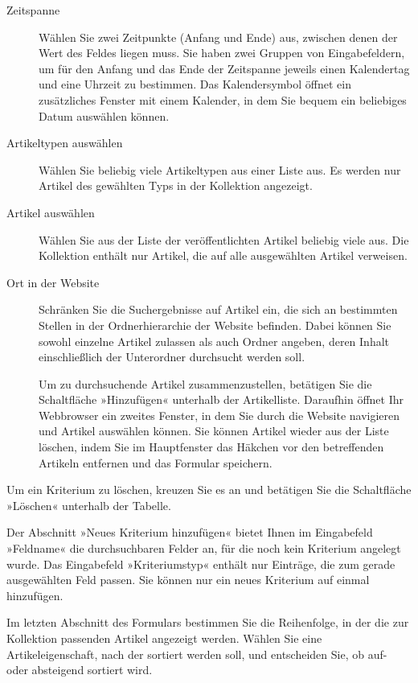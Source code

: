 \documentclass[a4paper,12pt,ngerman]{manual}
\begin{document}
\begin{description}
\item[Zeitspanne] \leavevmode
Wählen Sie zwei Zeitpunkte (Anfang und Ende) aus, zwischen
denen der Wert des Feldes liegen muss. Sie haben zwei Gruppen von
Eingabefeldern, um für den Anfang und das Ende der Zeitspanne jeweils einen
Kalendertag und eine Uhrzeit zu bestimmen. Das Kalendersymbol öffnet ein
zusätzliches Fenster mit einem Kalender, in dem Sie bequem ein beliebiges
Datum auswählen können.

\item[Artikeltypen auswählen] \leavevmode
Wählen Sie beliebig viele Artikeltypen aus einer
Liste aus. Es werden nur Artikel des gewählten Typs in der Kollektion
angezeigt.

\item[Artikel auswählen] \leavevmode
Wählen Sie aus der Liste der veröffentlichten Artikel
beliebig viele aus.  Die Kollektion enthält nur
Artikel, die auf alle ausgewählten Artikel verweisen.

\item[Ort in der Website] \leavevmode
Schränken Sie die Suchergebnisse auf Artikel ein,
die sich an bestimmten Stellen in der Ordnerhierarchie der Website befinden.
Dabei können Sie sowohl einzelne Artikel zulassen als auch Ordner angeben,
deren Inhalt einschließlich der Unterordner durchsucht werden soll.

Um zu durchsuchende Artikel zusammenzustellen, betätigen Sie die
Schaltfläche »Hinzufügen« unterhalb der Artikelliste. Daraufhin
öffnet Ihr Webbrowser ein zweites Fenster, in dem Sie durch die Website
navigieren und Artikel auswählen können. Sie können Artikel wieder aus der
Liste löschen, indem Sie im Hauptfenster das Häkchen vor den betreffenden
Artikeln entfernen und das Formular speichern.

\end{description}

Um ein Kriterium zu löschen, kreuzen Sie es an und betätigen Sie die
Schaltfläche »Löschen« unterhalb der Tabelle.

Der Abschnitt »Neues Kriterium hinzufügen« bietet Ihnen im Eingabefeld
»Feldname« die durchsuchbaren Felder an, für die noch kein Kriterium angelegt
wurde. Das Eingabefeld »Kriteriumstyp« enthält nur Einträge, die zum gerade
ausgewählten Feld passen. Sie können nur ein neues Kriterium auf einmal
hinzufügen.

Im letzten Abschnitt des Formulars bestimmen Sie die Reihenfolge, in der die
zur Kollektion passenden Artikel angezeigt werden. Wählen Sie eine
Artikeleigenschaft, nach der sortiert werden soll, und entscheiden Sie, ob
auf- oder absteigend sortiert wird.
\end{document}
